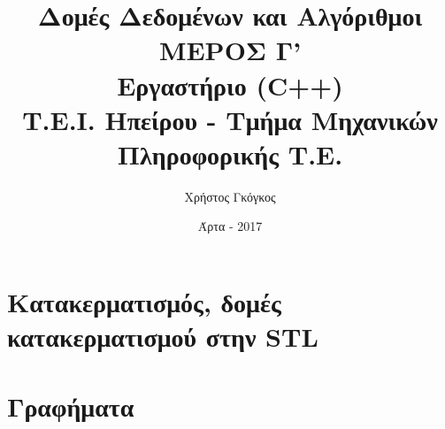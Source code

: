 \documentclass[11pt,a4paper]{book}
\title{Δομές Δεδομένων και Αλγόριθμοι \\ ΜΕΡΟΣ Γ' \\ Εργαστήριο (C++)\\ Τ.Ε.Ι. Ηπείρου - Τμήμα Μηχανικών Πληροφορικής Τ.Ε.}
\author{Χρήστος Γκόγκος }
\date{Άρτα - 2017}
\begin{document}
\maketitle
\mainmatter

\setcounter{chapter}{6} 
\chapter{Κατακερματισμός, δομές κατακερματισμού στην STL}


\chapter{Γραφήματα}

\end{document}
